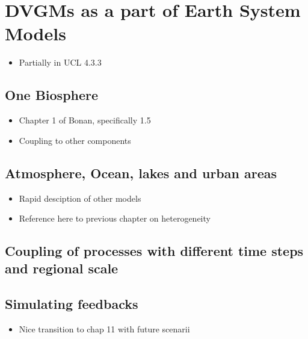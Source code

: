 \documentclass[12pt,oneside]{book}
\providecommand{\tightlist}{%
  \setlength{\itemsep}{0pt}\setlength{\parskip}{0pt}}
\begin{document}
\section{DVGMs as a part of Earth System
Models}\label{dvgms-as-a-part-of-earth-system-models}

\begin{itemize}
\tightlist
\item
  Partially in UCL 4.3.3
\end{itemize}

\subsection{One Biosphere}\label{one-biosphere}

\begin{itemize}
\tightlist
\item
  Chapter 1 of Bonan, specifically 1.5
\item
  Coupling to other components
\end{itemize}

\subsection{Atmosphere, Ocean, lakes and urban
areas}\label{atmosphere-ocean-lakes-and-urban-areas}

\begin{itemize}
\tightlist
\item
  Rapid desciption of other models
\item
  Reference here to previous chapter on heterogeneity
\end{itemize}

\subsection{Coupling of processes with different time steps and regional
scale}\label{coupling-of-processes-with-different-time-steps-and-regional-scale}

\subsection{Simulating feedbacks}\label{simulating-feedbacks}

\begin{itemize}
\tightlist
\item
  Nice transition to chap 11 with future scenarii
\end{itemize}
\end{document}
